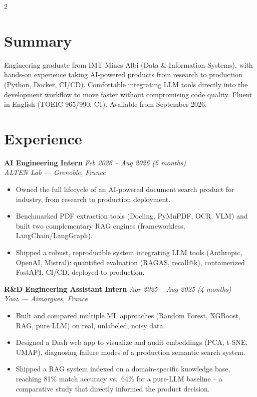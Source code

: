 \documentclass[10.5pt,a4paper]{article}
\newcommand{\sectionrule}{\vspace{-6pt}{\color{accent}\hrule height 1pt}\vspace{7pt}}
\newcommand{\cvexp}[5]{%
  \noindent\textbf{#1} \hfill {\itshape\color{graytext}\small #4}\\
  {\itshape #2 --- #3}\\[-2pt]
  #5
  \vspace{9pt}
}
\begin{document}
\setlength{\columnsep}{1.5em}
\begin{paracol}{2}

\section*{Summary}
\sectionrule
\justifying
Engineering graduate from IMT Mines Albi (Data \& Information Systems), with hands-on experience taking AI-powered products from research to production (Python, Docker, CI/CD). Comfortable integrating LLM tools directly into the development workflow to move faster without compromising code quality. Fluent in English (TOEIC 965/990, C1). Available from September 2026.

\section*{Experience}
\sectionrule

\cvexp{AI Engineering Intern}{ALTEN Lab}{Grenoble, France}{Feb 2026 -- Aug 2026 (6 months)}{%
  \begin{itemize}[leftmargin=12pt, itemsep=2pt, topsep=0pt, partopsep=0pt, parsep=0pt]
    \item Owned the full lifecycle of an AI-powered document search product for industry, from research to production deployment.
    \item Benchmarked PDF extraction tools (Docling, PyMuPDF, OCR, VLM) and built two complementary RAG engines (frameworkless, LangChain/\allowbreak LangGraph).
    \item Shipped a robust, reproducible system integrating LLM tools (Anthropic, OpenAI, Mistral): quantified evaluation (RAGAS, recall@k), containerized FastAPI, CI/CD, deployed to production.
  \end{itemize}
}

\cvexp{R\&D Engineering Assistant Intern}{Yooz}{Aimargues, France}{Apr 2025 -- Aug 2025 (4 months)}{%
  \begin{itemize}[leftmargin=12pt, itemsep=2pt, topsep=0pt, partopsep=0pt, parsep=0pt]
    \item Built and compared multiple ML approaches (Random Forest, XGBoost, RAG, pure LLM) on real, unlabeled, noisy data.
    \item Designed a Dash web app to visualize and audit embeddings (PCA, t-SNE, UMAP), diagnosing failure modes of a production semantic search system.
    \item Shipped a RAG system indexed on a domain-specific knowledge base, reaching 81\% match accuracy vs.\ 64\% for a pure-LLM baseline -- a comparative study that directly informed the product decision.
  \end{itemize}
}


\end{paracol}
\end{document}
